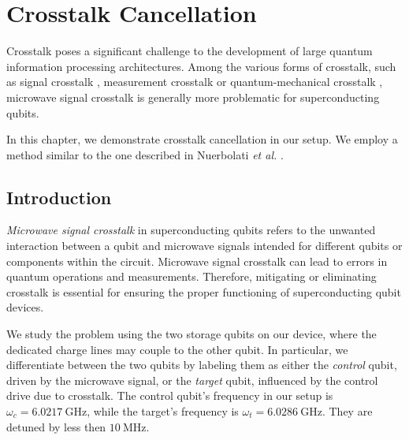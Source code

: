 \chapter{Crosstalk Cancellation}
\label{chap:crosstalk}
\thispagestyle{fancy}

Crosstalk poses a significant challenge to the development of large quantum information processing architectures.
Among the various forms of crosstalk, such as signal crosstalk \cite{signal_crosstalk}, measurement crosstalk \cite{meas_crosstalk} or quantum-mechanical crosstalk \cite{QM_crosstalk}, microwave signal crosstalk is generally more problematic for superconducting qubits.

In this chapter, we demonstrate crosstalk cancellation in our setup. 
We employ a method similar to the one described in Nuerbolati \emph{et al.} \cite{crosstalk}.

\section{Introduction}

\emph{Microwave signal crosstalk} in superconducting qubits refers to the unwanted interaction between a qubit and microwave signals intended for different qubits or components within the circuit.
Microwave signal crosstalk can lead to errors in quantum operations and measurements.
Therefore, mitigating or eliminating crosstalk is essential for ensuring the proper functioning of superconducting qubit devices.

We study the problem using the two storage qubits on our device, where the dedicated charge lines may couple to the other qubit.
In particular, we differentiate between the two qubits by labeling them as either the \emph{control} qubit, driven by the microwave signal, or the \emph{target} qubit, influenced by the control drive due to crosstalk.
The control qubit's frequency in our setup is $\omega_c = \SI{6.0217}{\giga \hertz}$, while the target's frequency is $\omega_t = \SI{6.0286}{\giga \hertz}$.
They are detuned by less then $\SI{10}{\mega \hertz}$.


